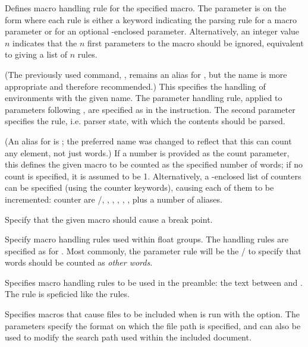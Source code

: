 
\begin{description}
\sloppy

Defines macro handling rule for the specified macro. The parameter is on the form  where each rule is either a keyword indicating the parsing rule for a macro parameter or  for an optional \code{[]}-enclosed parameter. Alternatively, an integer value $n$ indicates that the $n$ first parameters to the macro should be ignored, equivalent to giving a list of $n$  rules.

(The previously used command, , remains an alias for , but the name  is more appropriate and therefore recommended.)
This specifies the handling of environments with the given name. The parameter handling rule, applied to parameters following , are specified as in the  instruction. The second parameter specifies the rule, i.e. parser state, with which the contents should be parsed.

(An alias for  is ; the preferred name was changed to reflect that this can count any element, not just words.)
If a number is provided as the count parameter, this defines the given macro to be counted as the specified number of words; if no count is specified, it is assumed to be 1. Alternatively, a \code{[]}-enclosed list of counters can be specified (using the counter keywords), causing each of them to be incremented: counter are /, , , , , ,  plus a number of aliases.

Specify that the given macro should cause a break point.

Specify macro handling rules used within float groups. The handling rules are specified as for . Most commonly, the parameter rule will be the / to specify that words should be counted as \textit{other words}.

Specifies macro handling rules to be used in the preamble: the text between  and . The rule is speficied like the  rules.

Specifies macros that cause files to be included when \TeXcount{} is run with the  option. The parameters specify the format on which the file path is specified, and can also be used to modify the search path used within the included document.

\end{description}